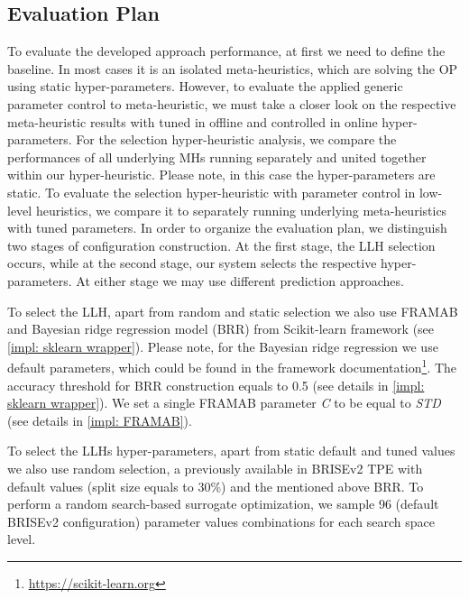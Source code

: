 \subsection{Evaluation Plan}\label{eval:1:plan}
To evaluate the developed approach performance, at first we need to define the baseline. In most cases it is an isolated meta-heuristics, which are solving the OP using static hyper-parameters. However, to evaluate the applied generic parameter control to meta-heuristic, we must take a closer look on the respective meta-heuristic results with tuned in offline and controlled in online hyper-parameters. For the selection hyper-heuristic analysis, we compare the performances of all underlying MHs running separately and united together within our hyper-heuristic. Please note, in this case the hyper-parameters are static. To evaluate the selection hyper-heuristic with parameter control in low-level heuristics, we compare it to separately running underlying meta-heuristics with tuned parameters. In order to organize the evaluation plan, we distinguish two stages of configuration construction. At the first stage, the LLH selection occurs, while at the second stage, our system selects the respective hyper-parameters. At either stage we may use different prediction approaches. 

To select the LLH, apart from random and static selection we also use FRAMAB and Bayesian ridge regression model (BRR) from Scikit-learn framework (see \cref{impl: sklearn wrapper}). Please note, for the Bayesian ridge regression we use default parameters, which could be found in the framework documentation\footnote{\href{https://scikit-learn.org/stable/modules/generated/sklearn.linear_model.BayesianRidge.html}{https://scikit-learn.org}}. The accuracy threshold for BRR construction equals to 0.5 (see details in \cref{impl: sklearn wrapper}). We set a single FRAMAB parameter \emph{C} to be equal to \emph{STD} (see details in \cref{impl: FRAMAB}). 

To select the LLHs hyper-parameters, apart from static default and tuned values we also use random selection, a previously available in BRISEv2 TPE with default values (split size equals to 30\%) and the mentioned above BRR. To perform a random search-based surrogate optimization, we sample 96 (default BRISEv2 configuration) parameter values combinations for each search space level.

